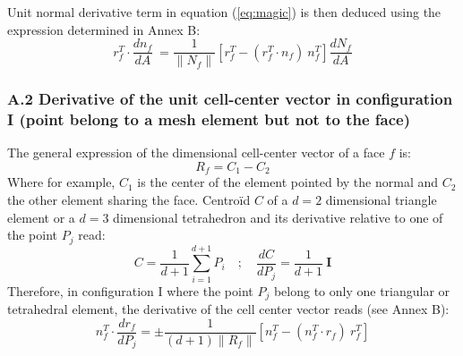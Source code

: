 \documentclass[11pt]{article}
\begin{document}
Unit normal derivative term in equation (\ref{eq:magic}) is then deduced using the expression determined in Annex B:
\begin{equation}
r_f^T\cdot \frac{d n_f}{dA}\ = 
 \frac{1}{\| N_f \|} \left[ r_f^T -  (r_f^T \cdot n_f)\ n_f^T \right] \frac{d N_f}{dA}
 \label{deriv_n_f}
\end{equation}
%

\subsubsection*{A.2 Derivative of the unit cell-center vector in configuration I (point belong to a mesh element but not to the face)}

The general expression of the dimensional cell-center vector of a face $f$ is:
\begin{equation}
R_f = C_1 - C_2
\end{equation}
Where for example, $C_1$ is the center of the element pointed by the normal and $C_2$ the other element sharing the face.
Centroïd $C$ of a $d=2$ dimensional triangle element or a $d=3$ dimensional tetrahedron and its derivative relative to one of the point $P_j$ read:
\begin{equation}
C = \frac{1}{d+1} \sum_{i=1}^{d+1} P_i  \quad ; \quad \frac{dC}{dP_j} = \frac{1}{d+1}\ \boldsymbol{I}
\end{equation}
Therefore, in configuration I where the point $P_j$ belong to only one triangular or tetrahedral element, the derivative of the cell center vector reads (see Annex B):
\begin{equation}
n_f^T \cdot \frac{d r_f}{d P_j} = \pm
\frac{1}{(d+1) \| R_f \|} \left[ n_f^T -  (n_f^T \cdot r_f)\ r_f^T \right] 
\end{equation}
\end{document}
